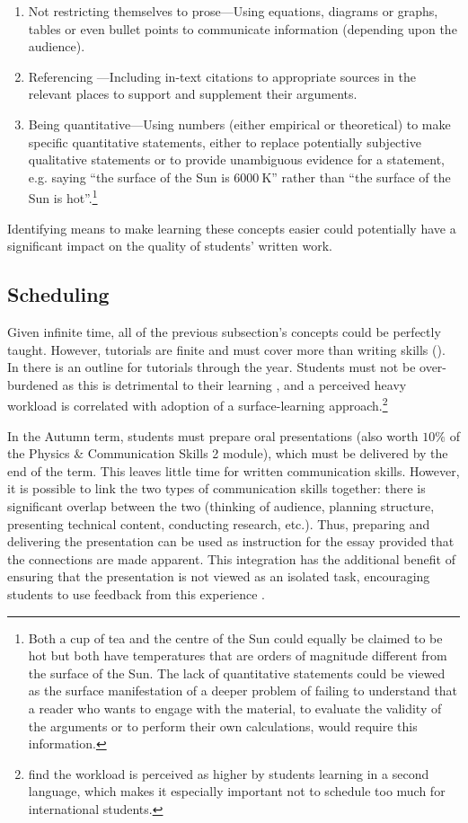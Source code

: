 \begin{enumerate}
\item Not restricting themselves to prose---Using equations, diagrams or graphs, tables or even bullet points to communicate information (depending upon the audience).
\item Referencing \citep{Warner2011}---Including in-text citations to appropriate sources in the relevant places to support and supplement their arguments.
\item Being quantitative---Using numbers (either empirical or theoretical) to make specific quantitative statements, either to replace potentially subjective qualitative statements or to provide unambiguous evidence for a statement, e.g. saying ``the surface of the Sun is $6000~\mathrm{K}$'' rather than ``the surface of the Sun is hot''.\footnote{Both a cup of tea and the centre of the Sun could equally be claimed to be hot but both have temperatures that are orders of magnitude different from the surface of the Sun. The lack of quantitative statements could be viewed as the surface manifestation of a deeper problem of failing to understand that a reader who wants to engage with the material, to evaluate the validity of the arguments or to perform their own calculations, would require this information.}
\end{enumerate}
Identifying means to make learning these concepts easier could potentially have a significant impact on the quality of students' written work.

\subsection{Scheduling}\label{sec:timetable}

Given infinite time, all of the previous subsection's concepts could be perfectly taught. However, tutorials are finite and must cover more than writing skills (). In  there is an outline for tutorials through the year. Students must not be over-burdened as this is detrimental to their learning \citep[chapter 8]{Ramsden1992}, and a perceived heavy workload is correlated with adoption of a surface-learning approach\citep[and references therein]{Kember1998}.\footnote{\citet{Kember1998} find the workload is perceived as higher by students learning in a second language, which makes it especially important not to schedule too much for international students.}

In the Autumn term, students must prepare oral presentations (also worth $10\%$ of the Physics \& Communication Skills 2 module), which must be delivered by the end of the term. This leaves little time for written communication skills. However, it is possible to link the two types of communication skills together: there is significant overlap between the two (thinking of audience, planning structure, presenting technical content, conducting research, etc.). Thus, preparing and delivering the presentation can be used as instruction for the essay provided that the connections are made apparent. This integration has the additional benefit of ensuring that the presentation is not viewed as an isolated task, encouraging students to use feedback from this experience \citep{Housell2003}.

